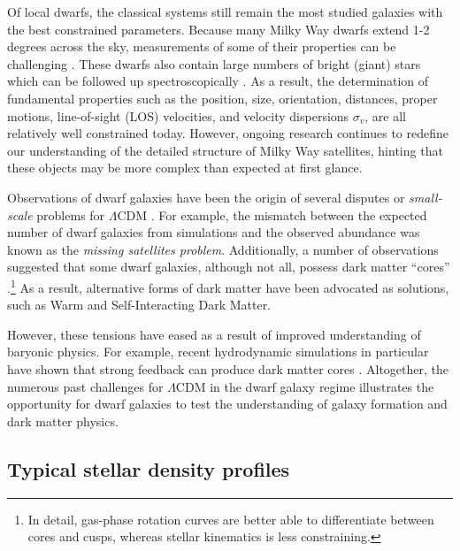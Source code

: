 Of local dwarfs, the classical systems still remain the most studied
galaxies with the best constrained parameters. Because many Milky Way
dwarfs extend 1-2 degrees across the sky, measurements of some of their
properties can be challenging \citep[e.g.,][]{mateo1998}. These dwarfs
also contain large numbers of bright (giant) stars which can be followed
up spectroscopically \citep[e.g.,][]{tolstoy+2023, pace+2020}. As a
result, the determination of fundamental properties such as the
position, size, orientation, distances, proper motions, line-of-sight
(LOS) velocities, and velocity dispersions \(\sigma_v\), are all
relatively well constrained today. However, ongoing research continues
to redefine our understanding of the detailed structure of Milky Way
satellites, hinting that these objects may be more complex than expected
at first glance.

Observations of dwarf galaxies have been the origin of several disputes
or \emph{small-scale} problems for \(\Lambda\)CDM \citep[see
review][]{bullock+boylan-kolchin2017}. For example, the mismatch between
the expected number of dwarf galaxies from simulations and the observed
abundance was known as the \emph{missing satellites problem}.
Additionally, a number of observations suggested that some dwarf
galaxies, although not all, possess dark matter ``cores''
\citep[e.g.,][]{moore1994, adams+2014, oh+2015, walker+penarrubia2011, read+walker+steger2019}.\footnote{In
  detail, gas-phase rotation curves are better able to differentiate
  between cores and cusps, whereas stellar kinematics is less
  constraining.} As a result, alternative forms of dark matter have been
advocated as solutions, such as Warm and Self-Interacting Dark Matter.

However, these tensions have eased as a result of improved understanding
of baryonic physics. For example, recent hydrodynamic simulations in
particular have shown that strong feedback can produce dark matter cores
\citep[e.g.,][]{tollet+2016, fitts+2017, benitez-llambay+2019, orkney+2021}.
Altogether, the numerous past challenges for \(\Lambda\)CDM in the dwarf
galaxy regime illustrates the opportunity for dwarf galaxies to test the
understanding of galaxy formation and dark matter physics.

\subsection{Typical stellar density
profiles}\label{typical-stellar-density-profiles}

